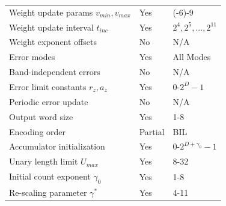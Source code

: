 \begin{table}[h]
\begin{tabular}{lll}
		Weight update params $v_{min}, v_{max}$ & Yes              & (-6)-9                      \\
		Weight update interval $t_{inc}$        & Yes              & $2^4, 2^5,...,2^{11}$       \\
		Weight exponent offsets                 & No               & N/A                         \\
		Error modes                             & Yes              & All Modes                   \\
		Band-independent errors                 & No               & N/A                         \\
		Error limit constants $r_z, a_z$        & Yes              & 0-$2^D-1$                   \\
		Periodic error update                   & No               & N/A                         \\
		Output word size                        & Yes              & 1-8                         \\
		Encoding order                          & Partial          & BIL                         \\
		Accumulator initialization              & Yes              & 0-$2^{D+\gamma_0}-1$        \\
		Unary length limit $U_{max}$            & Yes              & 8-32                        \\
		Initial count exponent $\gamma_0$       & Yes              & 1-8                         \\
		Re-scaling parameter $\gamma^{*}$       & Yes              & 4-11                        \\
		\hline
	\end{tabular}
\end{table}
